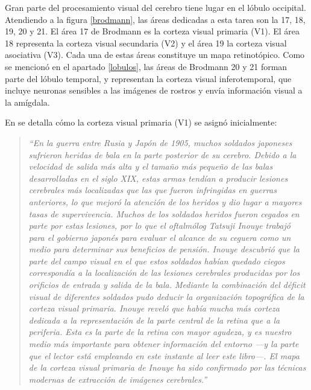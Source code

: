 Gran parte del procesamiento visual del cerebro tiene lugar en el lóbulo occipital. Atendiendo a la figura \ref{brodmann}, las áreas dedicadas a esta tarea son la 17, 18, 19, 20 y 21. El área 17 de Brodmann es la corteza visual primaria (V1). El área 18 representa la corteza visual secundaria (V2) y el área 19 la corteza visual asociativa (V3). Cada una de estas áreas constituye un mapa retinotópico. Como se mencionó en el apartado \ref{lobulos}, las áreas de Brodmann 20 y 21 forman parte del lóbulo temporal, y representan la corteza visual inferotemporal, que incluye neuronas sensibles a las imágenes de rostros y envía información visual a la amígdala.    

En \cite{JohnAllman2000} se detalla cómo la corteza visual primaria (V1) se asignó inicialmente:

\begin{quote}
{\it ``En la guerra entre Rusia y Japón de 1905, muchos soldados japoneses sufrieron heridas de bala en la parte posterior de su cerebro. Debido a la velocidad de salida más alta y el tamaño más pequeño de las balas desarrolladas en el siglo XIX, estas armas tendían a producir lesiones cerebrales más localizadas que las que fueron infringidas en guerras anteriores, lo que mejoró la atención de los heridos y dio lugar a mayores tasas de supervivencia. Muchos de los soldados heridos fueron cegados en parte por estas lesiones, por lo que el oftalmólog Tatsuji Inouye trabajó para el gobierno japonés para evaluar el alcance de su ceguera como un medio para determinar sus beneficios de pensión. Inouye descubrió que la parte del campo visual en el que estos soldados habían quedado ciegos correspondía a la localización de las lesiones cerebrales producidas por los orificios de entrada y salida de la bala. Mediante la combinación del déficit visual de diferentes soldados pudo deducir la organización topográfica de la corteza visual primaria. Inouye reveló que había mucha más corteza dedicada a la representación de la parte central de la retina que a la periferia. Esta es la parte de la retina con mayor agudeza, y es nuestro medio más importante para obtener información del entorno ---y la parte que el lector está empleando en este instante al leer este libro---. El mapa de la corteza visual primaria de Inouye ha sido confirmado por las técnicas modernas de extracción de imágenes cerebrales.''}
\end{quote}

